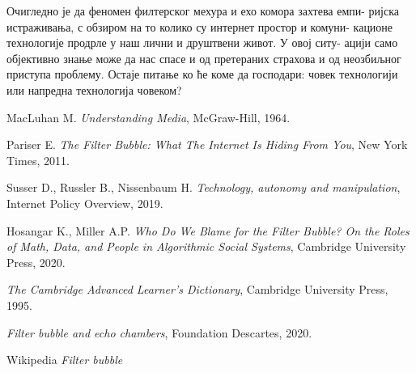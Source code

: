 \documentclass[a4paper]{article}
\begin{document}
Очигледно је да феномен филтерског мехура и ехо комора захтева емпи-
ријска
истраживања, с обзиром на то колико су интернет простор и комуни-
кационе технологије
продрле у наш лични и друштвени живот. У овој ситу-
ацији само објективно знање може
да нас спасе и од претераних страхова и од неозбиљног приступа проблему. Остаје питање
ко ће коме да господари: човек технологији или напредна технологија човеком?




\appendix

\iffalse
 

\fi

\bigskip
\newpage

\begin{thebibliography}{7}

 MacLuhan M. \emph{Understanding Media}, McGraw-Hill, 1964.

 Pariser E. \emph{The Filter Bubble: What The Internet Is Hiding From You}, New York Times, 2011.

 Susser D., Russler B., Nissenbaum H. \emph{Technology, autonomy and manipulation}, Internet Policy Overview, 2019.

 Hosangar K., Miller A.P. \emph{Who Do We Blame for the Filter Bubble? On the Roles of Math, Data, and People in Algorithmic Social Systems}, Cambridge University Press, 2020.

 \emph{The Cambridge Advanced Learner's Dictionary}, Cambridge University Press, 1995.

 \emph{Filter bubble and echo chambers}, Foundation Descartes, 2020.

 Wikipedia \emph{Filter bubble}


\end{thebibliography}
\end{document}
